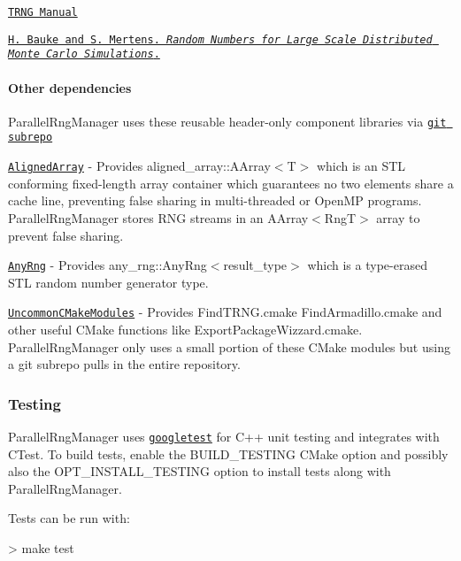\begin{DoxyItemize}
\item \href{https://www.numbercrunch.de/trng/trng.pdf}{\tt T\+R\+NG Manual}
\item \href{http://arxiv.org/abs/cond-mat/0609584}{\tt H. Bauke and S. Mertens. {\itshape Random Numbers for Large Scale Distributed Monte Carlo Simulations}.}
\end{DoxyItemize}

\paragraph*{Other dependencies}

Parallel\+Rng\+Manager uses these reusable header-\/only component libraries via \href{https://github.com/ingydotnet/git-subrepo}{\tt {\ttfamily git subrepo}}
\begin{DoxyItemize}
\item \href{https://github.com/markjolah/AlignedArray}{\tt Aligned\+Array} -\/ Provides {\ttfamily aligned\+\_\+array\+::\+A\+Array$<$T$>$} which is an S\+TL conforming fixed-\/length array container which guarantees no two elements share a cache line, preventing false sharing in multi-\/threaded or Open\+MP programs. Parallel\+Rng\+Manager stores R\+NG streams in an {\ttfamily A\+Array$<$RngT$>$} array to prevent false sharing.
\item \href{https://github.com/markjolah/AnyRng}{\tt Any\+Rng} -\/ Provides {\ttfamily any\+\_\+rng\+::\+Any\+Rng$<$result\+\_\+type$>$} which is a type-\/erased S\+TL random number generator type.
\item \href{https://github.com/markjolah/UncommonCMakeModules}{\tt Uncommon\+C\+Make\+Modules} -\/ Provides {\ttfamily Find\+T\+R\+N\+G.\+cmake} {\ttfamily Find\+Armadillo.\+cmake} and other useful C\+Make functions like {\ttfamily Export\+Package\+Wizzard.\+cmake}. Parallel\+Rng\+Manager only uses a small portion of these C\+Make modules but using a {\ttfamily git subrepo} pulls in the entire repository.
\end{DoxyItemize}

\subsubsection*{Testing}

Parallel\+Rng\+Manager uses \href{https://github.com/google/googletest}{\tt googletest} for C++ unit testing and integrates with C\+Test. To build tests, enable the {\ttfamily B\+U\+I\+L\+D\+\_\+\+T\+E\+S\+T\+I\+NG} C\+Make option and possibly also the {\ttfamily O\+P\+T\+\_\+\+I\+N\+S\+T\+A\+L\+L\+\_\+\+T\+E\+S\+T\+I\+NG} option to install tests along with Parallel\+Rng\+Manager.

Tests can be run with\+: \begin{DoxyVerb}> make test\end{DoxyVerb}
 